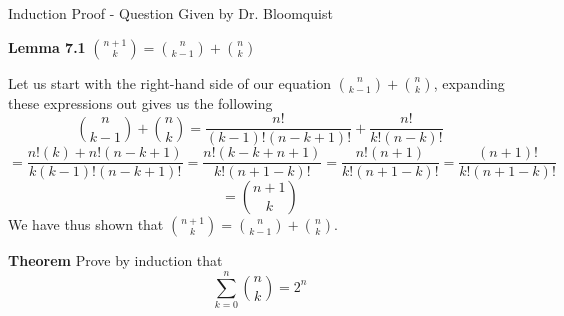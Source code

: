 Induction Proof - Question Given by Dr. Bloomquist



\textbf{Lemma 7.1} ${n +1 \choose k} = {n \choose k - 1} + {n \choose k}$

Let us start with the right-hand side of our equation ${n \choose k - 1} + {n \choose k}$, expanding these expressions out gives us the following 
$$ {n \choose k - 1} + {n \choose k} = \frac{n!}{(k-1)!(n-k+1)!} + \frac{n!}{k!(n-k)!}$$
$$ = \frac{n!(k) + n!(n-k+1)}{k(k-1)!(n-k+1)!} = \frac{n!(k -k + n + 1)}{k! (n+1 - k)!} = \frac{n!(n+1)}{k! (n+1 - k)!} = \frac{(n+1)!}{k! (n+1 - k)!}$$
$$ = {n+1 \choose k}$$
We have thus shown that ${n +1 \choose k} = {n \choose k - 1} + {n \choose k}$.

\textbf{Theorem}
Prove by induction that \[ \sum_{k=0}^{n} {n \choose k}= 2^n \]

